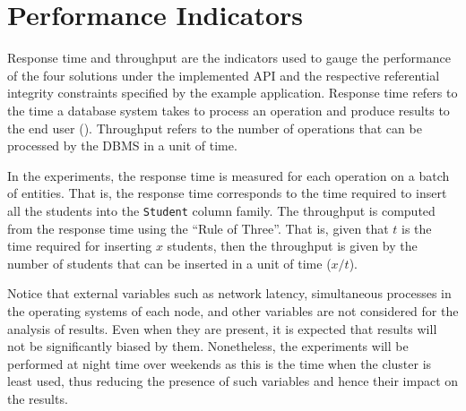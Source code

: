 \section{Performance Indicators} \label{sexp:PerformanceIndicators}

Response time and throughput are the indicators used to gauge the
performance of the four solutions under the implemented \ac{API} and the
respective referential integrity constraints specified by the example
application. Response time refers to the time a database system
  takes to process an operation and produce results to the end
 user (). Throughput 
 refers to  the number of operations that can be processed by the \ac{DBMS}
  in a unit of time.

In the experiments, the response time is measured for each operation on a batch
of entities. That is, the response time corresponds to the time required to
insert all the students into the \texttt{Student} column family. The throughput
is computed from the response time using the ``Rule of Three''. That is, 
given that $t$ is the time required for inserting $x$  students, then the
throughput is given by the number of students that can be inserted in a unit of
time ($x/t$).    

Notice that external variables such as network latency,  simultaneous processes
in the operating systems of each node,  and other variables are not considered
for the analysis of results.  Even when they are present,  it is expected that
results will not be significantly biased by them.  Nonetheless,  the
experiments will be  performed at night time over weekends as this is the time
 when the cluster is least used,  thus reducing the presence of such variables
and hence their impact on the results. 





  



